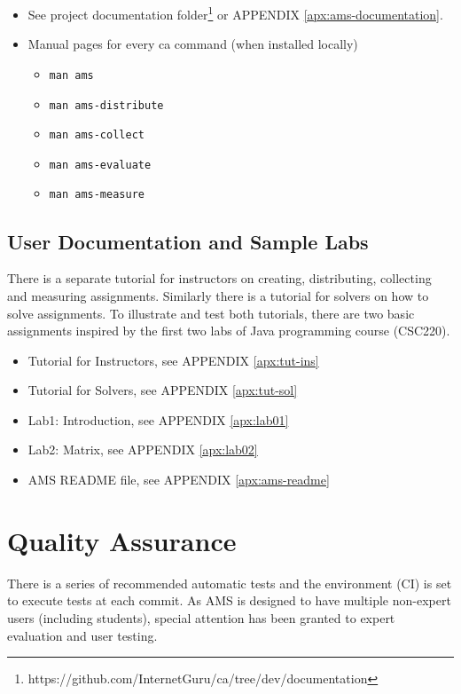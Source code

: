 \begin{itemize}
\item
  {See project documentation folder\footnote{https://github.com/InternetGuru/ca/tree/dev/documentation} or APPENDIX \ref{apx:ams-documentation}.}
\item
  {Manual pages for every ca command (when installed locally)}
  \begin{itemize}
  \item
    {\texttt{man ams}}
  \item
    {\texttt{man ams-distribute}}
  \item
    {\texttt{man ams-collect}}
  \item
    {\texttt{man ams-evaluate}}
  \item
    {\texttt{man ams-measure}}
  \end{itemize}
\end{itemize}

\subsection{User Documentation and Sample Labs}\label{ssec:userdocandlabs}

{There is a separate tutorial for instructors on creating, distributing, collecting and measuring assignments. Similarly there is a tutorial for solvers on how to solve assignments. To illustrate and test both tutorials, there are two basic assignments inspired by the first two labs of Java programming course (CSC220).}

\begin{itemize}
\item
  {Tutorial for Instructors, see APPENDIX \ref{apx:tut-ins}}
\item
  {Tutorial for Solvers, see APPENDIX \ref{apx:tut-sol}}
\item
  {Lab1: Introduction, see APPENDIX \ref{apx:lab01}}
\item
  {Lab2: Matrix, see APPENDIX \ref{apx:lab02}}
\item
  {AMS README file, see APPENDIX \ref{apx:ams-readme}}
\end{itemize}

\section{Quality Assurance}\label{sec:qa}

{There is a series of recommended automatic tests and the environment (CI) is set to execute tests at each commit. As AMS is designed to have multiple non-expert users (including students), special attention has been granted to expert evaluation and user testing.}

